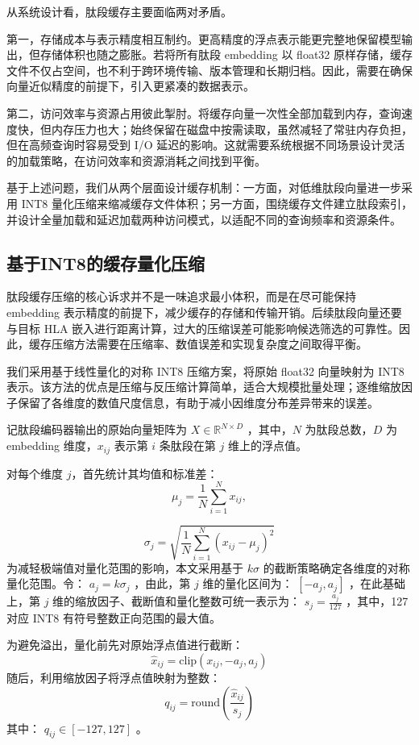 从系统设计看，肽段缓存主要面临两对矛盾。

第一，存储成本与表示精度相互制约。更高精度的浮点表示能更完整地保留模型输出，但存储体积也随之膨胀。若将所有肽段 embedding 以 float32 原样存储，缓存文件不仅占空间，也不利于跨环境传输、版本管理和长期归档。因此，需要在确保向量近似精度的前提下，引入更紧凑的数据表示。

第二，访问效率与资源占用彼此掣肘。将缓存向量一次性全部加载到内存，查询速度快，但内存压力也大；始终保留在磁盘中按需读取，虽然减轻了常驻内存负担，但在高频查询时容易受到 I/O 延迟的影响。这就需要系统根据不同场景设计灵活的加载策略，在访问效率和资源消耗之间找到平衡。

基于上述问题，我们从两个层面设计缓存机制：一方面，对低维肽段向量进一步采用 INT8 量化压缩来缩减缓存文件体积；另一方面，围绕缓存文件建立肽段索引，并设计全量加载和延迟加载两种访问模式，以适配不同的查询频率和资源条件。

\subsection{基于INT8的缓存量化压缩}

肽段缓存压缩的核心诉求并不是一味追求最小体积，而是在尽可能保持 embedding 表示精度的前提下，减少缓存的存储和传输开销。后续肽段向量还要与目标 HLA 嵌入进行距离计算，过大的压缩误差可能影响候选筛选的可靠性。因此，缓存压缩方法需要在压缩率、数值误差和实现复杂度之间取得平衡。

我们采用基于线性量化的对称 INT8 压缩方案，将原始 float32 向量映射为 INT8 表示。该方法的优点是压缩与反压缩计算简单，适合大规模批量处理；逐维缩放因子保留了各维度的数值尺度信息，有助于减小因维度分布差异带来的误差。

记肽段编码器输出的原始向量矩阵为 $X \in \mathbb{R}^{N \times D}$ ，其中，$N$ 为肽段总数，$D$ 为 embedding 维度，$x_{ij}$ 表示第 $i$ 条肽段在第 $j$ 维上的浮点值。

对每个维度 $j$，首先统计其均值和标准差：
\[
    \mu_j
    =
    \frac{1}{N}
    \sum_{i=1}^{N} x_{ij},
\]

\[
    \sigma_j
    =
    \sqrt{
        \frac{1}{N}
        \sum_{i=1}^{N}
        \left(x_{ij}-\mu_j\right)^2
    }
\]
为减轻极端值对量化范围的影响，本文采用基于 $k\sigma$ 的截断策略确定各维度的对称量化范围。令： $a_j = k\sigma_j$ ，由此，第 $j$ 维的量化区间为： $\left[-a_j, a_j\right]$ ，在此基础上，第 $j$ 维的缩放因子、截断值和量化整数可统一表示为： $s_j = \frac{a_j}{127}$ ，其中，127 对应 INT8 有符号整数正向范围的最大值。

为避免溢出，量化前先对原始浮点值进行截断：
\[
    \hat{x}_{ij}
    =
    \mathrm{clip}
    \left(
        x_{ij},
        -a_j,
        a_j
    \right)
\]
随后，利用缩放因子将浮点值映射为整数：
\[
    q_{ij}
    =
    \mathrm{round}
    \left(
        \frac{\hat{x}_{ij}}{s_j}
    \right)
\]
其中： $q_{ij} \in \left[-127,127\right]$ 。

